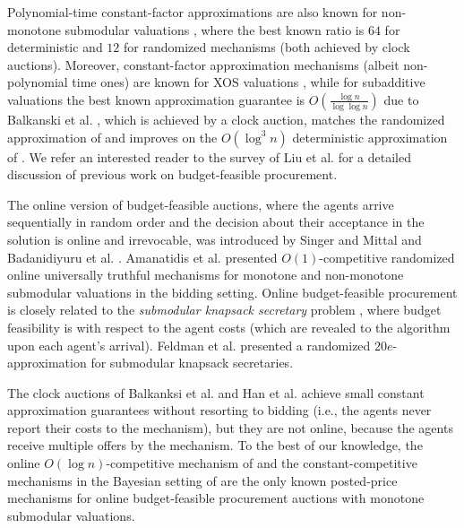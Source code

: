 Polynomial-time constant-factor approximations are also known for non-monotone submodular valuations \cite{AmanatidisKS22,HuangHC023}, where the best known ratio is $64$ for deterministic  \cite{BalkanskiGGST2022} and $12$ for randomized mechanisms \cite{HanWHC23} (both achieved by clock auctions). Moreover, constant-factor approximation mechanisms (albeit non-polynomial time ones) are known for XOS valuations \cite{BeiCGL2012,AmanatidisBM17}, while for subadditive valuations the best known approximation guarantee is $O(\frac{\log n}{\log\log n})$ due to Balkanski et al. \cite{BalkanskiGGST2022}, which is achieved by a clock auction, matches the randomized approximation of \cite{BeiCGL2012} and improves on the $O(\log^3 n)$ deterministic approximation of \cite{DobzinskiPS11}. We refer an interested reader to the survey of Liu et al. \cite{LCLW2024_survey} for a detailed discussion of previous work on budget-feasible procurement. 

The online version of budget-feasible auctions, where the agents arrive sequentially in random order and the decision about their acceptance in the solution is online and irrevocable, was introduced by Singer and Mittal \cite{SingerM13} and Badanidiyuru et al. \cite{Bada2012}. %
Amanatidis et al. \cite{AmanatidisKS22} presented $O(1)$-competitive randomized online universally truthful mechanisms for monotone and non-monotone submodular valuations in the bidding setting. Online budget-feasible procurement is closely related to the \emph{submodular knapsack secretary} problem \cite{BateniHZ13,KesselheimT17}, where budget feasibility is with respect to the agent costs (which are revealed to the algorithm upon each agent's arrival). Feldman et al. \cite{FeldmanNS11} presented a randomized $20e$-approximation for submodular knapsack secretaries.



The clock auctions of Balkanksi et al. \cite{BalkanskiGGST2022} and Han et al. \cite{HanWHC23} achieve small constant approximation guarantees without resorting to  bidding (i.e., the agents never report their costs to the mechanism), but
they are not online, because the agents receive multiple offers by the mechanism. To the best of our knowledge, the online $O(\log n)$-competitive mechanism of \cite[Section~4]{Bada2012} and the constant-competitive mechanisms in the Bayesian setting of 
\cite{BalkHart16} are the only known posted-price mechanisms for online budget-feasible procurement auctions with monotone submodular valuations. 


